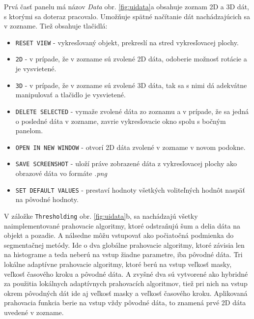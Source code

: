 \documentclass[a4paper,11pt,oneside]{article}%
\begin{document}
Prvá časť panelu má názov \textit{Data} obr. \ref{fig:uidata}a obsahuje zoznam 2D a 3D dát, s ktorými sa doteraz pracovalo. Umožňuje spätné načítanie dát nachádzajúcich sa v zozname. Tiež obsahuje tlačidlá: 
\begin{itemize}
\item \texttt{RESET VIEW} - vykresľovaný objekt, prekreslí na stred vykresľovacej plochy.  
\item \texttt{2D} - v prípade, že v zozname sú zvolené 2D dáta, odoberie možnosť rotácie a je vysvietené.
\item \texttt{3D} - v prípade, že v zozname sú zvolené 3D dáta, tak sa s nimi dá adekvátne manipulovať a tlačidlo je vysvietené.
\item \texttt{DELETE SELECTED} - vymaže zvolené dáta zo zoznamu a v prípade, že sa jedná o posledné dáta v zozname, zavrie vykresľovacie okno spolu s bočným panelom.
\item \texttt{OPEN IN NEW WINDOW} - otvorí 2D dáta zvolené v zozname v novom podokne.
\item \texttt{SAVE SCREENSHOT} - uloží práve zobrazené dáta z vykresľovacej plochy ako obrazové dáta vo formáte \textit{.png}
\item \texttt{SET DEFAULT VALUES} - prestaví hodnoty všetkých voliteľných hodnôt naspäť na pôvodné  hodnoty.
\end{itemize}

V záložke \texttt{Thresholding} obr. \ref{fig:uidata}b, sa nachádzajú všetky naimplementované prahovacie algoritmy, ktoré odstraňujú šum a delia dáta na objekt a pozadie. A nálsedne môžu vstupovať ako počiatočná podmienka do segmentačnej metódy. Ide o dva globálne prahovacie algoritmy, ktoré závisia len na histograme a teda neberú na vstup žiadne parametre, iba pôvodné dáta. Tri lokálne adaptívne prahovacie algoritmy, ktoré berú na vstup veľkosť masky, veľkosť časového kroku a pôvodné dáta. A zvyšné dva sú vytvorené ako hybridné za použitia lokálnych adaptívnych prahovacích algoritmov, tiež pri nich na vstup okrem pôvodných dát ide aj veľkosť masky a veľkosť časového kroku. Aplikovaná prahovacia funkcia berie na vstup vždy pôvodné dáta, to znamená prvé 2D dáta uvedené v zozname.
\end{document}
